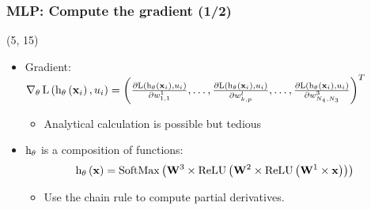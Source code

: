 
\begin{frame}[label=Backpropagation]
  \frametitle{\acl{MLP}: Compute the gradient (1/2)}

  \begin{textblock}{90}(5, 15)
    \begin{itemize}
    \item Gradient:
      $
      \operatorname{\nabla}_{\mathbf{\theta}} \mathrm{L} \left ( {\mathrm{h}_{\mathbf{\theta}} \left ( {\mathbf{x}_i} \right ), u_i} \right ) =
      \left( \frac{\partial \mathrm{L} \left ( {\mathrm{h}_{\mathbf{\theta}} \left ( {\mathbf{x}_i} \right ),
            u_i} \right )}{\partial w_{1,1}^1}, \ldots, \frac{\partial \mathrm{L} \left ( {\mathrm{h}_{\mathbf{\theta}} \left ( {\mathbf{x}_i} \right ), u_i} \right )}{\partial w_{k,p}^l},\ldots,\frac{\partial \mathrm{L} \left ( {\mathrm{h}_{\mathbf{\theta}} \left ( {\mathbf{x}_i} \right ), u_i} \right )}{\partial w_{N_{4},N_{3}}^{3}} \right)^T
      $

      \begin{itemize}
      \item Analytical calculation is possible but tedious
      \end{itemize}
    \item $\mathrm{h}_{\mathbf{\theta}}$ is a composition of functions:
      \[
        \apply{\hyp_{\params}}{\example} = \apply{\softMaxFunc}{%
          \weightMatrix^3 \times
          \apply{\ReLUFunc}{%
            \weightMatrix^2 \times
            \apply{\ReLUFunc}{%
              \weightMatrix^1 \times \example
            }
          }
        }
      \]
      \begin{itemize}
      \item Use the chain rule to compute partial derivatives.
      \end{itemize}
    \end{itemize}
  \end{textblock}
\end{frame}

